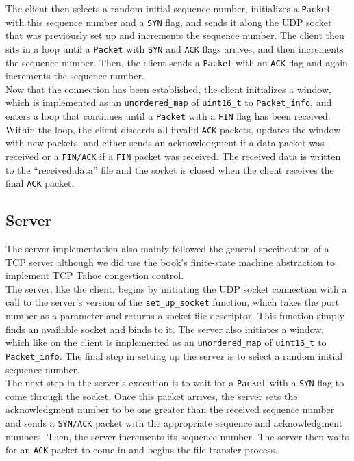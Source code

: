 \documentclass{article}
\begin{document}
\noindent
The client then selects a random initial sequence number, initializes a \texttt{Packet} with this sequence number and a \texttt{SYN} flag, and sends it along the UDP socket that was previously set up and increments the sequence number. The client then sits in a loop until a \texttt{Packet} with \texttt{SYN} and \texttt{ACK} flags arrives, and then increments the sequence number. Then, the client sends a \texttt{Packet} with an \texttt{ACK} flag and again increments the sequence number. \\

\noindent
Now that the connection has been established, the client initializes a window, which is implemented as an \texttt{unordered\_map} of \texttt{uint16\_t} to \texttt{Packet\_info}, and enters a loop that continues until a \texttt{Packet} with a \texttt{FIN} flag has been received. Within the loop, the client discards all invalid \texttt{ACK} packets, updates the window with new packets, and either sends an acknowledgment if a data packet was received or a \texttt{FIN/ACK} if a \texttt{FIN} packet was received. The received data is written to the ``received.data'' file and the socket is closed when the client receives the final \texttt{ACK} packet.

\subsection{Server}

The server implementation also mainly followed the general specification of a TCP server although we did use the book's finite-state machine abstraction to implement TCP Tahoe congestion control. \\

\noindent
The server, like the client, begins by initiating the UDP socket connection with a call to the server's version of the \texttt{set\_up\_socket} function, which takes the port number as a parameter and returns a socket file descriptor. This function simply finds an available socket and binds to it. The server also initiates a window, which like on the client is implemented as an \texttt{unordered\_map} of \texttt{uint16\_t} to \texttt{Packet\_info}. The final step in setting up the server is to select a random initial sequence number. \\

\noindent
The next step in the server's execution is to wait for a \texttt{Packet} with a \texttt{SYN} flag to come through the socket. Once this packet arrives, the server sets the acknowledgment number to be one greater than the received sequence number and sends a \texttt{SYN/ACK} packet with the appropriate sequence and acknowledgment numbers. Then, the server increments its sequence number. The server then waits for an \texttt{ACK} packet to come in and begins the file transfer process. \\
\end{document}
